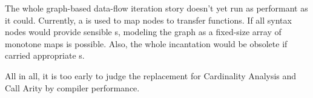 The whole graph-based data-flow iteration story doesn't yet run as performant as it could.
Currently, a  is used to map nodes to transfer functions.
If all syntax nodes would provide sensible s, modeling the graph as a fixed-size array of monotone maps is possible.
Also, the whole  incantation would be obsolete if  carried appropriate s.

All in all, it is too early to judge the replacement for Cardinality Analysis and Call Arity by compiler performance.

